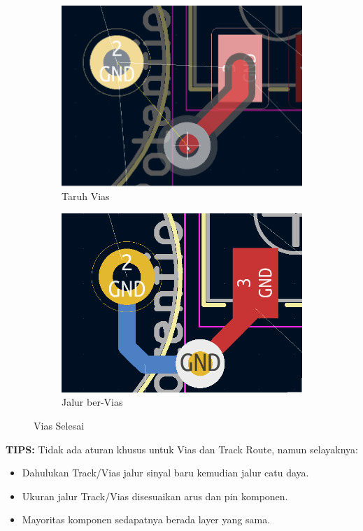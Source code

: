 \documentclass[12pt]{book}
\begin{document}
	\begin{figure}[!ht]
		\centering
		\begin{subfigure}[t]{0.45\textwidth}
			\includegraphics[width=\textwidth]{images/pcb/pcb_17}
			\caption{Taruh Vias}
		\end{subfigure}
		\begin{subfigure}[t]{0.45\textwidth}
			\includegraphics[width=\textwidth]{images/pcb/pcb_18}
			\caption{Jalur ber-Vias}
		\end{subfigure}
		\caption{Vias Selesai}
	\end{figure}

	\textbf{TIPS:} Tidak ada aturan khusus untuk Vias dan Track Route, namun selayaknya:
	\begin{itemize}
		\item Dahulukan Track/Vias jalur sinyal baru kemudian jalur catu daya.
		\item Ukuran jalur Track/Vias disesuaikan arus dan pin komponen.
		\item Mayoritas komponen sedapatnya berada layer yang sama.
	\end{itemize}
\end{document}
